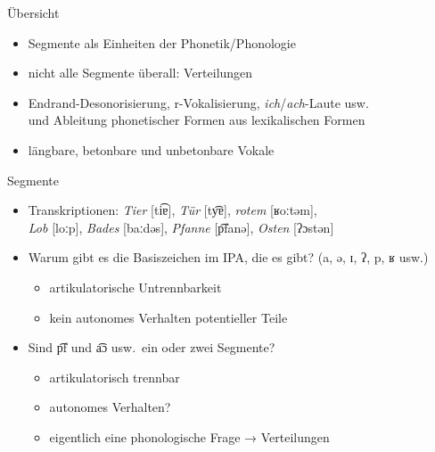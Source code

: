 \begin{frame}
  {Übersicht}
  \pause
  \begin{itemize}[<+->]
    \item \alert{Segmente} als Einheiten der Phonetik\slash Phonologie
    \item nicht alle Segmente überall: \alert{Verteilungen}
    \item Endrand-Desonorisierung, r-Vokalisierung, \textit{ich}\slash\textit{ach}-Laute usw.\\
      und \alert{Ableitung} phonetischer Formen aus lexikalischen Formen
    \item längbare, betonbare und unbetonbare Vokale
  \end{itemize}
\end{frame}


\begin{frame}
  {Segmente}
  \pause
  \begin{itemize}[<+->]
    \item Transkriptionen: \textit{Tier} [ti͡ɐ], \textit{Tür} [ty͡ɐ], \textit{rotem} [ʁoːtəm],\\
      \textit{Lob} [loːp], \textit{Bades} [baːdəs], \textit{Pfanne} [p͡fanə], \textit{Osten} [ʔɔstən]
      \vspace{\baselineskip}
    \item Warum gibt es die Basiszeichen im IPA, die es gibt? (a, ə, ɪ, ʔ, p, ʁ usw.)
      \begin{itemize}
        \item \alert{artikulatorische Untrennbarkeit}
        \item \alert{kein autonomes Verhalten potentieller Teile}
      \end{itemize}
      \vspace{\baselineskip}
    \item Sind p͡f und a͡ɔ usw.\ ein oder zwei Segmente? 
      \begin{itemize}
        \item artikulatorisch trennbar
        \item autonomes Verhalten?
        \item eigentlich eine phonologische Frage → Verteilungen
      \end{itemize}
  \end{itemize}
\end{frame}

